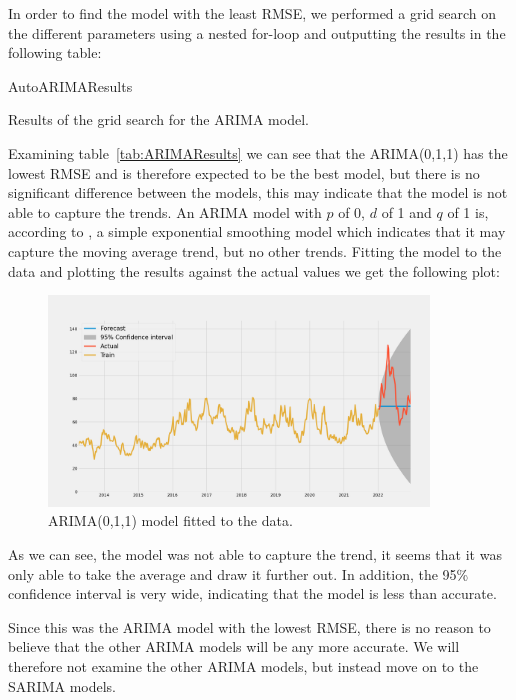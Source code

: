 In order to find the model with the least RMSE, we performed a grid search on the different parameters using a nested for-loop and outputting the results in the following table: 
\begin{table}[H]
    \begin{center}
        {AutoARIMAResults}
        \caption{Results of the grid search for the ARIMA model.}\label{tab:ARIMAResults}
    \end{center}
\end{table}
Examining table~\ref{tab:ARIMAResults} we can see that the ARIMA(0,1,1) has the lowest RMSE and is therefore expected to be the best model, but there is no significant difference between the models, this may indicate that the model is not able to capture the trends. An ARIMA model with $p$ of 0, $d$ of 1 and $q$ of 1 is, according to \textcite{nau_2019}, a simple exponential smoothing model which indicates that it may capture the moving average trend, but no other trends. Fitting the model to the data and plotting the results against the actual values we get the following plot:
\begin{figure}[H]
    \begin{center}
        \includegraphics[width=0.9\textwidth]{data/Figures/ARIMA/ARIMA_0_1_1.png}
        \caption{ARIMA(0,1,1) model fitted to the data.}\label{fig:ARIMA_011}
    \end{center}
\end{figure}
As we can see, the model was not able to capture the trend, it seems that it was only able to take the average and draw it further out. In addition, the 95\% confidence interval is very wide, indicating that the model is less than accurate.

Since this was the ARIMA model with the lowest RMSE, there is no reason to believe that the other ARIMA models will be any more accurate. We will therefore not examine the other ARIMA models, but instead move on to the SARIMA models.

